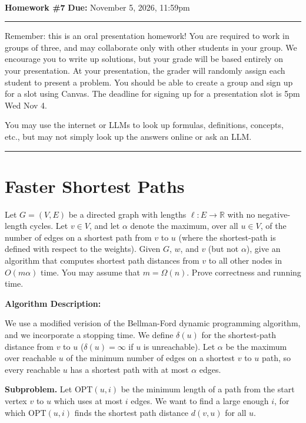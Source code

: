 \documentclass[11pt]{article}
\newcommand{\R}{\ensuremath{\mathbb R}}
\begin{document}
\\ 
{{\bf Homework \#7}} \hfill {{\bf Due:} November 5, 2026, 11:59pm} \\
\rule[0.1in]{\textwidth}{0.4pt}

Remember: this is an oral presentation homework! You are required to work in groups of three, and may collaborate only with other students in your group. 
We encourage you to write up solutions, but your grade will be based entirely on your presentation. 
At your presentation, the grader will randomly assign each student to present a problem. 
You should be able to create a group and sign up for a slot using Canvas. The deadline for signing up for a presentation slot is 5pm Wed Nov 4.

You may use the internet or LLMs to look up formulas, definitions, concepts, etc., but may not simply look up the answers online or ask an LLM.  

\noindent \rule[0.1in]{\textwidth}{0.4pt}

\section{Faster Shortest Paths}

Let $G = (V, E)$ be a directed graph with lengths $\ell : E \rightarrow \R$ with no negative-length cycles. 
Let $v \in V$, and let $\alpha$ denote the maximum, over all $u \in V$, of the number of edges on a shortest path from $v$ to $u$ 
(where the shortest-path is defined with respect to the weights).  Given $G$, $w$, and $v$ (but not $\alpha$), 
give an algorithm that computes shortest path distances from $v$ to all other nodes in $O(m \alpha)$ time. You may assume that $m = \Omega(n)$. 
Prove correctness and running time.

\bigbreak

\textbf{Algorithm Description:}

We use a modified verision of the Bellman-Ford dynamic programming algorithm, and we incorporate a stopping time. 
We define $\delta(u)$ for the shortest-path distance from $v$ to $u$ ($\delta(u) = \infty$ if $u$ is unreachable). 
Let $\alpha$ be the maximum over reachable $u$ of the minimum number of edges on a shortest $v$ to $u$ path, 
so every reachable $u$ has a shortest path with at most $\alpha$ edges. 

\textbf{Subproblem.} 
Let OPT$(u, i)$ be the minimum length of a path from the start vertex $v$ to $u$ which uses at most $i$ edges. 
We want to find a large enough $i$, for which OPT$(u, i)$ finds the shortest path distance $d(v, u)$ for all $u$.
\end{document}
